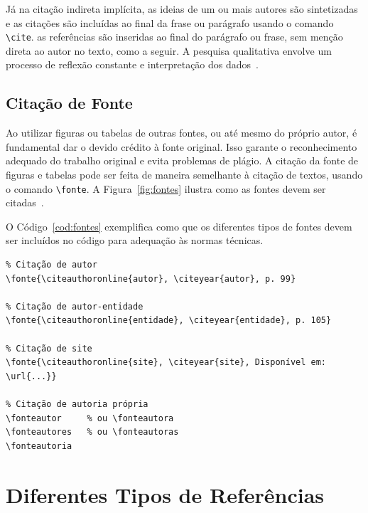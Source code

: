 Já na citação indireta implícita, as ideias de um ou mais autores são sintetizadas e as citações são incluídas ao final da frase ou parágrafo usando o comando \texttt{\textbackslash cite}. as referências são inseridas ao final do parágrafo ou frase, sem menção direta ao autor no texto, como a seguir. A pesquisa qualitativa envolve um processo de reflexão constante e interpretação dos dados~\cite{creswell}.

\subsection{Citação de Fonte}

Ao utilizar figuras ou tabelas de outras fontes, ou até mesmo do próprio autor, é fundamental dar o devido crédito à fonte original. Isso garante o reconhecimento adequado do trabalho original e evita problemas de plágio. A citação da fonte de figuras e tabelas pode ser feita de maneira semelhante à citação de textos, usando o comando \texttt{\textbackslash fonte}. A Figura~\ref{fig:fontes} ilustra como as fontes devem ser citadas~\cite{utp_normas2024}.

\begin{figure}[htb]
\end{figure}

O Código~\ref{cod:fontes} exemplifica como que os diferentes tipos de fontes devem ser incluídos no código para adequação às normas técnicas.

\begin{codigo}[htb]
\begin{lstlisting}
% Citação de autor
\fonte{\citeauthoronline{autor}, \citeyear{autor}, p. 99}

% Citação de autor-entidade
\fonte{\citeauthoronline{entidade}, \citeyear{entidade}, p. 105}

% Citação de site
\fonte{\citeauthoronline{site}, \citeyear{site}, Disponível em: \url{...}}

% Citação de autoria própria
\fonteautor     % ou \fonteautora
\fonteautores   % ou \fonteautoras
\fonteautoria
\end{lstlisting}
\fonteautor
\end{codigo}

\section{Diferentes Tipos de Referências}

